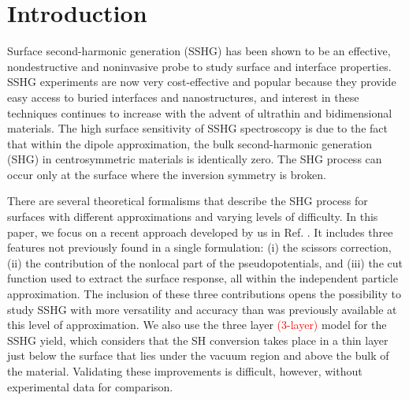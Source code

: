 \documentclass[prb,superscriptaddress,showpacs,twocolumn,letterpaper]{revtex4}
\newcommand{\correction}[1]{\textcolor{red}{#1}}
\begin{document}
\section{Introduction}\label{sec:intro}

Surface second-harmonic generation (SSHG) has been shown to be an effective,
nondestructive and noninvasive probe to study surface and interface
properties.\cite{bloembergenAPB99, chenPRL81, daumPRL93, downerPSSA01,
downerSIA01, hughesPRB96, mcgilpOE94, mcgilpSRL99, mendozaPRL98, shenNAT89} SSHG
experiments are now very cost-effective and popular because they provide easy
access to buried interfaces and nanostructures, and interest in these techniques
continues to increase with the advent of ultrathin and bidimensional
materials.\cite{deanPRB14, malardPRB13} The high surface sensitivity of SSHG
spectroscopy is due to the fact that within the dipole approximation, the bulk
second-harmonic generation (SHG) in centrosymmetric materials is identically
zero. The SHG process can occur only at the surface where the inversion symmetry
is broken.

There are several theoretical formalisms that describe the SHG process for
surfaces with different approximations and varying levels of
difficulty.\cite{levinePRB94,mendozaPRL98, arzatePRB01, mendozaPRB01,
mejiaPRB02, sanoPRB02, mejiaRMF04, trollePRB14} In this paper, we focus on a
recent approach developed by us in Ref. . It includes
three features not previously found in a single formulation: (i) the scissors
correction, (ii) the contribution of the nonlocal part of the pseudopotentials,
and (iii) the cut function used to extract the surface response, all within the
independent particle approximation. The inclusion of these three contributions
opens the possibility to study SSHG with more versatility and accuracy than was
previously available at this level of approximation. We also use the three layer
\correction{
(3-layer)
}
model 
for the SSHG yield, which considers that the SH conversion takes place in
a thin layer just below the surface that lies under the vacuum region and above
the bulk of the material. Validating these improvements is difficult, however,
without experimental data for comparison.
\end{document}
